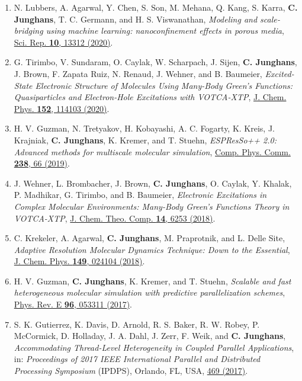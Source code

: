 \documentclass{article}
\begin{document}
\begin{enumerate}
\item[33.] N. Lubbers, A. Agarwal, Y. Chen, S. Son, M. Mehana, Q. Kang, S. Karra, \textbf{C. Junghans}, T. C. Germann, and  H. S. Viswanathan,
  \textit{Modeling and scale‐bridging using machine learning: nanoconfinement effects in porous media},
  \href{https://doi.org/10.1038/s41598-020-69661-0}{Sci. Rep. \textbf{10}, 13312 (2020)}.

\item[32.] G. Tirimbo, V. Sundaram, O. Caylak, W. Scharpach, J. Sijen, \textbf{C. Junghans}, J. Brown, F. Zapata Ruiz, N. Renaud, J. Wehner, and B. Baumeier,
  \textit{Excited-State Electronic Structure of Molecules Using Many-Body Green’s Functions: Quasiparticles and Electron-Hole Excitations with VOTCA-XTP},
  \href{https://doi.org/10.1063/1.5144277}{J. Chem. Phys. \textbf{152}, 114103 (2020)}.

\item[31.] H. V. Guzman, N. Tretyakov, H. Kobayashi, A. C. Fogarty, K. Kreis, J. Krajniak, \textbf{C. Junghans}, K. Kremer, and T. Stuehn,
  \textit{ESPResSo++ 2.0: Advanced methods for multiscale molecular simulation},
  \href{https://doi.org/10.1016/j.cpc.2018.12.017}{Comp. Phys. Comm. \textbf{238}, 66 (2019)}.

\item[30.] J. Wehner, L. Brombacher, J. Brown, \textbf{C. Junghans}, O. Caylak, Y. Khalak, P. Madhikar, G. Tirimbo, and B. Baumeier,
  \textit{Electronic Excitations in Complex Molecular Environments: Many-Body Green's Functions Theory in VOTCA-XTP},
  \href{https://doi.org/10.1021/acs.jctc.8b00617}{J. Chem. Theo. Comp. \textbf{14}, 6253 (2018)}.

\item[29.] C. Krekeler, A. Agarwal, \textbf{C. Junghans}, M. Praprotnik, and L. Delle Site,
  \textit{Adaptive Resolution Molecular Dynamics Technique: Down to the Essential},
  \href{https://doi.org/10.1063/1.5031206}{J. Chem. Phys. \textbf{149}, 024104 (2018)}.

\item[28.] H. V. Guzman, \textbf{C. Junghans}, K. Kremer, and T. Stuehn,
  \textit{Scalable and fast heterogeneous molecular simulation with predictive parallelization schemes},
  \href{https://doi.org/10.1103/PhysRevE.96.053311}{Phys. Rev. E \textbf{96}, 053311 (2017)}.

\item[27.] S. K. Gutierrez, K. Davis, D. Arnold, R. S. Baker, R. W. Robey, P. McCormick, D. Holladay, J. A. Dahl, J. Zerr, F. Weik, and \textbf{C. Junghans},
  \textit{Accommodating Thread-Level Heterogeneity in Coupled Parallel Applications},
  in: \textit{Proceedings of 2017 IEEE International Parallel and Distributed Processing Symposium} (IPDPS),
  Orlando, FL, USA, \href{http://dx.doi.org/10.1109/IPDPS.2017.13}{469 (2017)}.


\end{enumerate}
\end{document}
